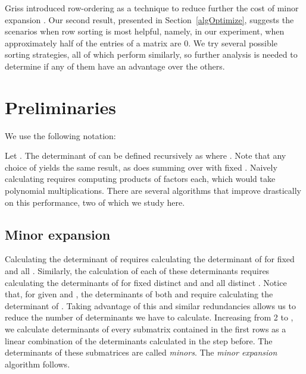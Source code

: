 \documentclass[12pt]{amsart}
\numberwithin{equation}{section}
\numberwithin{figure}{section}
\newcommand{\eq}[2][]{\ifthenelse{\equal{#1}{}}{\eqNoNum{#2}}{\eqNum{\label{#1}
#2}\\}}
\newcommand{\eqs}[2][]{\ifthenelse{\equal{#1}{}}{\eqsNoNum{#2}}{\eqsNum{\label{#1}#2}\\}}
\newcommand{\eqNoNum}[1]{}
\newcommand{\eqsNoNum}[1]{}
\newcommand{\eqNum}[2]{}
\newcommand{\eqsNum}[1]{}
\newcommand{\lrparen}[2][1]{\ifthenelse{\equal{#1}{1}}{(#2)}{\left(#2\right)}}
\newcommand{\Z}{\mathbb{Z}}
\newcommand{\set}[2]{\{\ifthenelse{\equal{#2}{}}{#1}{#1 : #2}\}}
\DeclareMathOperator{\subop}{sub}
\newcommand{\sub}[4][1]{\subop\lrparen[#1]{#2, #3, #4}}
\DeclareMathOperator{\detop}{det}
\renewcommand{\det}[2][1]{\detop\lrparen[#1]{#2}}
\newcommand{\nterms}[2][1]{T\lrparen[#1]{#2}}
\begin{document}
Griss introduced row-ordering as a technique to reduce further the cost of minor expansion \cite{griss1, griss2}. Our second result, presented in Section~\ref{algOptimize}, suggests the scenarios when row sorting is most helpful, namely, in our experiment, when approximately half of the entries of a matrix are 0. We try several possible sorting strategies, all of which perform similarly, so further analysis is needed to determine if any of them have an advantage over the others.


\section{Preliminaries}
We use the following notation:
\eqs{
A &= \text{an  matrix with entries in .} \\
a_{ij} &= \text{entry of  in row  and column ; starting index is 1.} \\
\det{A} &= \text{determinant of .} \\
[a] &= \set{n \in \Z}{1 \leq n \leq a}. \\
\sub{A}{I}{J} &= \text{submatrix of  using rows in  and columns in ,} \\ &\qquad \text{where .} \\
\nterms{p} &= \text{number of terms in polynomial .}
}

Let . The determinant of  can be defined recursively as
\eq[detDef]{
\det{A} =
\begin{cases}
a_{11} & \text{ if } n = 1 \\
\sum_{j=1}^{n}(-1)^{n+j}a_{ij}\det{A_{ij}} & \text{ otherwise},
\end{cases}
}
where . Note that any choice of  yields the same result, as does summing over  with fixed . Naively calculating  requires computing  products of  factors each, which would take  polynomial multiplications. There are several algorithms that improve drastically on this performance, two of which we study here.

\subsection{Minor expansion}\label{minExpIntro}
Calculating the determinant of  requires calculating the determinant of  for fixed  and all . Similarly, the calculation of each of these determinants requires calculating the determinants of  for fixed distinct  and  and all distinct . Notice that, for given  and , the determinants of both  and  require calculating the determinant of . Taking advantage of this and similar redundancies allows us to reduce the number of determinants we have to calculate. Increasing  from 2 to , we calculate determinants of every  submatrix contained in the first  rows as a linear combination of the  determinants calculated in the step before. The determinants of these submatrices are called \emph{minors}. The \emph{minor expansion} algorithm follows.
\end{document}
